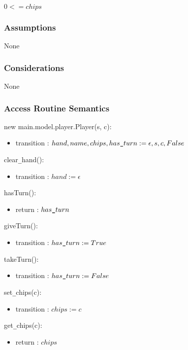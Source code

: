 \documentclass[12pt, titlepage]{article}
\begin{document}
$0 <= \mathit{chips}$

\subsubsection* {Assumptions}

None

\subsubsection* {Considerations}

None

\subsubsection* {Access Routine Semantics}

\noindent new main.model.player.Player(s, c):
\begin{itemize}
\item transition : $hand, name, chips, has\verb|_|turn := \epsilon, s, c, False$ 
\end{itemize}

\noindent clear\verb|_|hand():
\begin{itemize}
\item transition : $hand := \epsilon$ 
\end{itemize}

\noindent hasTurn():
\begin{itemize}
\item return : $has\verb|_|turn$ 
\end{itemize}

\noindent giveTurn():
\begin{itemize}
\item transition : $has\verb|_|turn := True$ 
\end{itemize}

\noindent takeTurn():
\begin{itemize}
\item transition : $has\verb|_|turn := False$ 
\end{itemize}

\noindent set\verb|_|chips(c):
\begin{itemize}
\item transition : $chips := c$ 
\end{itemize}

\noindent get\verb|_|chips(c):
\begin{itemize}
\item return : $chips$ 
\end{itemize}
\end{document}
